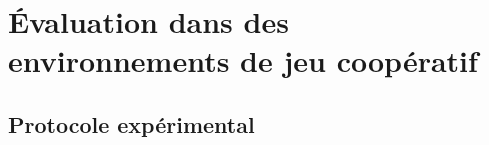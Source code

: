 



\section{Évaluation dans des environnements de jeu coopératif}


\subsection{Protocole expérimental}


